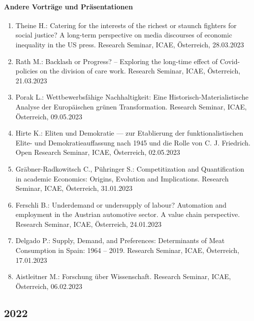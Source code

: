 \paragraph{Andere Vorträge und Präsentationen}
\begin{enumerate}
	\item Theine H.: Catering for the interests of the richest or staunch fighters for social justice? A long-term perspective on media discourses of economic inequality in the US press. Research Seminar, ICAE, Österreich, 28.03.2023
	\item Rath M.: Backlash or Progress? -- Exploring the long-time effect of Covid-policies on the division of care work. Research Seminar, ICAE, Österreich, 21.03.2023
	\item Porak L.: Wettbewerbsfähige Nachhaltigkeit: Eine Historisch-Materialistische Analyse der Europäischen grünen Transformation. Research Seminar, ICAE, Österreich, 09.05.2023
	\item Hirte K.: Eliten und Demokratie — zur Etablierung der funktionalistischen Elite- und Demokratieauffassung nach 1945 und die Rolle von C. J. Friedrich. Open Research Seminar, ICAE, Österreich, 02.05.2023
	\item Gräbner-Radkowitsch C., Pühringer S.: Competitization and Quantification in academic Economics: Origins, Evolution and Implications. Research Seminar, ICAE, Österreich, 31.01.2023
	\item Ferschli B.: Underdemand or undersupply of labour? Automation and employment in the Austrian automotive sector. A value chain perspective. Research Seminar, ICAE, Österreich, 24.01.2023
	\item Delgado P.: Supply, Demand, and Preferences: Determinants of Meat Consumption in Spain: 1964 – 2019. Research Seminar, ICAE, Österreich, 17.01.2023
	\item Aistleitner M.: Forschung über Wissenschaft. Research Seminar, ICAE, Österreich, 06.02.2023
\end{enumerate}
\subsection*{2022}
